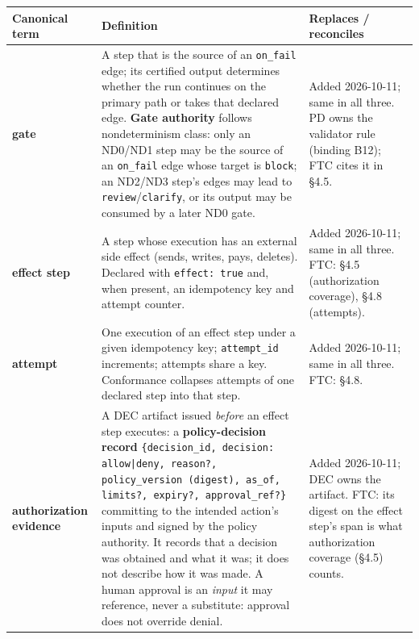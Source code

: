 \documentclass[11pt]{article}
\newcommand{\code}[1]{\texttt{#1}}
\begin{document}
\begin{center}
\footnotesize
\begin{tabular}{@{}p{2.7cm} p{7.1cm} p{5.6cm}@{}}
\toprule
\textbf{Canonical term} & \textbf{Definition} & \textbf{Replaces / reconciles} \\
\midrule
\textbf{gate} & A step that is the source of an \code{on\_fail} edge; its certified output determines whether the run continues on the primary path or takes that declared edge. \textbf{Gate authority} follows nondeterminism class: only an ND0/ND1 step may be the source of an \code{on\_fail} edge whose target is \code{block}; an ND2/ND3 step's edges may lead to \code{review}/\code{clarify}, or its output may be consumed by a later ND0 gate. & Added 2026-10-11; same in all three. PD owns the validator rule (binding B12); FTC cites it in \S4.5. \\
\addlinespace
\textbf{effect step} & A step whose execution has an external side effect (sends, writes, pays, deletes). Declared with \code{effect: true} and, when present, an idempotency key and attempt counter. & Added 2026-10-11; same in all three. FTC: \S4.5 (authorization coverage), \S4.8 (attempts). \\
\addlinespace
\textbf{attempt} & One execution of an effect step under a given idempotency key; \code{attempt\_id} increments; attempts share a key. Conformance collapses attempts of one declared step into that step. & Added 2026-10-11; same in all three. FTC: \S4.8. \\
\addlinespace
\textbf{authorization evidence} & A DEC artifact issued \emph{before} an effect step executes: a \textbf{policy-decision record} \code{\{decision\_id, decision: allow|deny, reason?, policy\_version (digest), as\_of, limits?, expiry?, approval\_ref?\}} committing to the intended action's inputs and signed by the policy authority. It records that a decision was obtained and what it was; it does not describe how it was made. A human approval is an \emph{input} it may reference, never a substitute: approval does not override denial. & Added 2026-10-11; DEC owns the artifact. FTC: its digest on the effect step's span is what authorization coverage (\S4.5) counts. \\
\bottomrule
\end{tabular}
\end{center}
\end{document}
